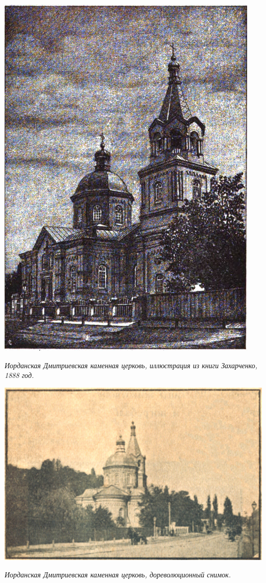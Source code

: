 \begin{center}
\includegraphics[width=0.70\linewidth]{chast-kirvys/lys02/1888-zaharchenko-iordan.jpg}

\textit{Иорданская Дмитриевская каменная церковь, иллюстрация из книги Захарченко, 1888 год.}
\end{center}

\newpage

\begin{center}
\includegraphics[width=\linewidth]{chast-kirvys/lys02/iordanskaja_cerkov.jpg}

\textit{Иорданская Дмитриевская каменная церковь, дореволюционный снимок.}
\end{center}


